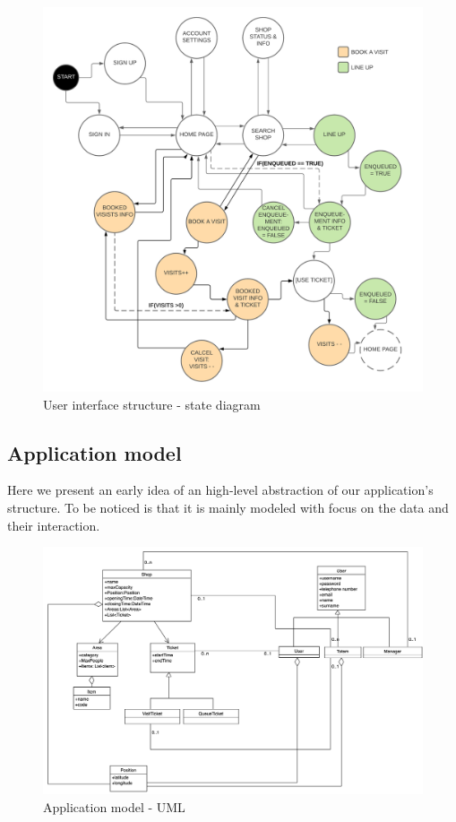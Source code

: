 \begin{figure}[h!]
    \centering
    \includegraphics[width=\textwidth]{Images/statediagrams/userinterface.png}
    \caption{\label{fig:userinterfacestructure}{User interface structure - state diagram}}
\end{figure}

\FloatBarrier

\subsection{Application model}
\label{subsect:applicationstructure}

Here we present an early idea of an high-level abstraction of our application's structure. To be noticed is that it is mainly modeled with focus on the data and their interaction.

\begin{figure}[h!]
    \centering
    \includegraphics[width=\textwidth]{Images/uml/umlclup.png}
    \caption{\label{fig:applicationmodel}{Application model - UML}}
\end{figure}